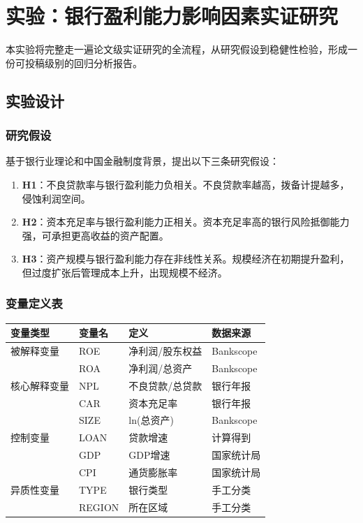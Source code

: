 \section{实验：银行盈利能力影响因素实证研究}

本实验将完整走一遍论文级实证研究的全流程，从研究假设到稳健性检验，形成一份可投稿级别的回归分析报告。

\subsection{实验设计}

\subsubsection{研究假设}

基于银行业理论和中国金融制度背景，提出以下三条研究假设：

\begin{enumerate}[leftmargin=2em]
  \item \textbf{H1}：不良贷款率与银行盈利能力负相关。不良贷款率越高，拨备计提越多，侵蚀利润空间。
  \item \textbf{H2}：资本充足率与银行盈利能力正相关。资本充足率高的银行风险抵御能力强，可承担更高收益的资产配置。
  \item \textbf{H3}：资产规模与银行盈利能力存在非线性关系。规模经济在初期提升盈利，但过度扩张后管理成本上升，出现规模不经济。
\end{enumerate}

\subsubsection{变量定义表}

\begin{table}[H]
\centering
\begin{tabular}{llll}
\toprule
\textbf{变量类型} & \textbf{变量名} & \textbf{定义} & \textbf{数据来源} \\
\midrule
被解释变量 & ROE & 净利润/股东权益 & Bankscope \\
 & ROA & 净利润/总资产 & Bankscope \\
\midrule
核心解释变量 & NPL & 不良贷款/总贷款 & 银行年报 \\
 & CAR & 资本充足率 & 银行年报 \\
 & SIZE & ln(总资产) & Bankscope \\
\midrule
控制变量 & LOAN & 贷款增速 & 计算得到 \\
 & GDP & GDP增速 & 国家统计局 \\
 & CPI & 通货膨胀率 & 国家统计局 \\
\midrule
异质性变量 & TYPE & 银行类型 & 手工分类 \\
 & REGION & 所在区域 & 手工分类 \\
\bottomrule
\end{tabular}
\end{table}

